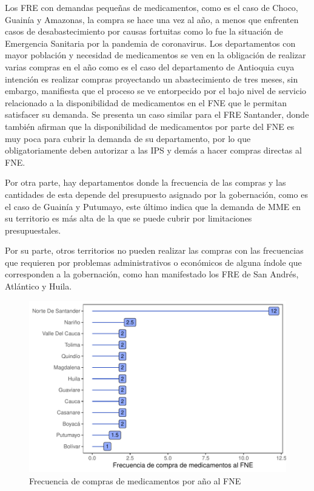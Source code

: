 \documentclass[
]{book}
\begin{document}
Los FRE con demandas pequeñas de medicamentos, como es el caso de Choco, Guainía y Amazonas, la compra se hace una vez al año, a menos que enfrenten casos de desabastecimiento por causas fortuitas como lo fue la situación de Emergencia Sanitaria por la pandemia de coronavirus. Los departamentos con mayor población y necesidad de medicamentos se ven en la obligación de realizar varias compras en el año como es el caso del departamento de Antioquia cuya intención es realizar compras proyectando un abastecimiento de tres meses, sin embargo, manifiesta que el proceso se ve entorpecido por el bajo nivel de servicio relacionado a la disponibilidad de medicamentos en el FNE que le permitan satisfacer su demanda. Se presenta un caso similar para el FRE Santander, donde también afirman que la disponibilidad de medicamentos por parte del FNE es muy poca para cubrir la demanda de su departamento, por lo que obligatoriamente deben autorizar a las IPS y demás a hacer compras directas al FNE.

Por otra parte, hay departamentos donde la frecuencia de las compras y las cantidades de esta depende del presupuesto asignado por la gobernación, como es el caso de Guainía y Putumayo, este último indica que la demanda de MME en su territorio es más alta de la que se puede cubrir por limitaciones presupuestales.

Por su parte, otros territorios no pueden realizar las compras con las frecuencias que requieren por problemas administrativos o económicos de alguna índole que corresponden a la gobernación, como han manifestado los FRE de San Andrés, Atlántico y Huila.

\begin{figure}
\includegraphics[width=0.9\linewidth]{InformeFinal_files/figure-latex/FrecComprasFNR-1} \caption{Frecuencia de compras de medicamentos por año al FNE}\label{fig:FrecComprasFNR}
\end{figure}
\end{document}

